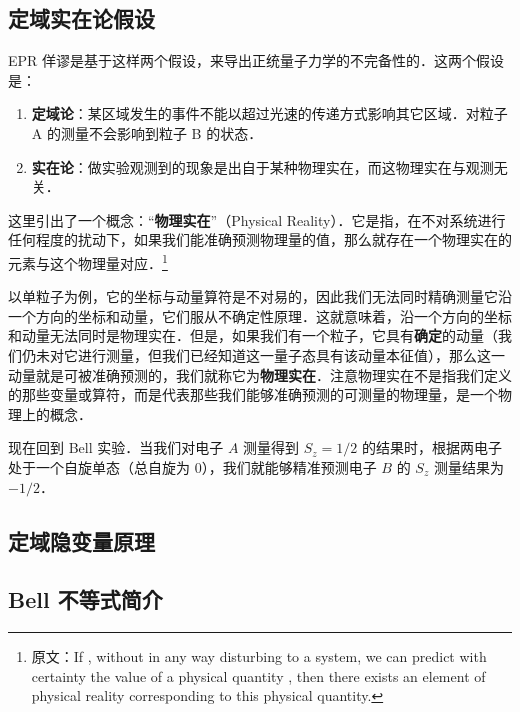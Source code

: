 \subsection{定域实在论假设}
EPR 佯谬是基于这样两个假设，来导出正统量子力学的不完备性的．这两个假设是：
\begin{enumerate}
\item \textbf{定域论}：某区域发生的事件不能以超过光速的传递方式影响其它区域．对粒子 A 的测量不会影响到粒子 B 的状态．
\item \textbf{实在论}：做实验观测到的现象是出自于某种物理实在，而这物理实在与观测无关．
\end{enumerate}
这里引出了一个概念：“\textbf{物理实在}”（Physical Reality）．它是指，在不对系统进行任何程度的扰动下，如果我们能准确预测物理量的值，那么就存在一个物理实在的元素与这个物理量对应．\footnote{原文：If , without in any way disturbing to a system, we can predict with certainty the value of a physical quantity , then there exists an element of physical reality corresponding to this physical quantity. }

以单粒子为例，它的坐标与动量算符是不对易的，因此我们无法同时精确测量它沿一个方向的坐标和动量，它们服从不确定性原理．这就意味着，沿一个方向的坐标和动量无法同时是物理实在．但是，如果我们有一个粒子，它具有\textbf{确定}的动量（我们仍未对它进行测量，但我们已经知道这一量子态具有该动量本征值），那么这一动量就是可被准确预测的，我们就称它为\textbf{物理实在}．注意物理实在不是指我们定义的那些变量或算符，而是代表那些我们能够准确预测的可测量的物理量，是一个物理上的概念．

现在回到 Bell 实验．当我们对电子 $A$ 测量得到 $S_z=1/2$ 的结果时，根据两电子处于一个自旋单态（总自旋为 $0$），我们就能够精准预测电子 $B$ 的 $S_z$ 测量结果为 $-1/2$．
\subsection{定域隐变量原理}
\subsection{Bell 不等式简介}